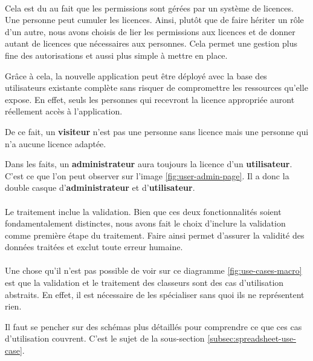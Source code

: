 \paragraph{}
Cela est du au fait que les permissions sont gérées par un système de licences. Une personne peut cumuler les licences. Ainsi, plutôt que de faire hériter un rôle d'un autre, nous avons choisis de lier les permissions aux licences et de donner autant de licences que nécessaires aux personnes. Cela permet une gestion plus fine des autorisations et aussi plus simple à mettre en place.

Grâce à cela, la nouvelle application peut être déployé avec la base des utilisateurs existante complète sans risquer de compromettre les ressources qu'elle expose. En effet, seuls les personnes qui recevront la licence appropriée auront réellement accès à l'application.

De ce fait, un \textbf{visiteur} n'est pas une personne sans licence mais une personne qui n'a aucune licence adaptée.

Dans les faits, un \textbf{administrateur} aura toujours la licence d'un \textbf{utilisateur}. C'est ce que l'on peut observer sur l'image \ref{fig:user-admin-page}. Il a donc la double casque d'\textbf{administrateur} et d'\textbf{utilisateur}.

\paragraph{}
Le traitement inclue la validation. Bien que ces deux fonctionnalités soient fondamentalement distinctes, nous avons fait le choix d'inclure la validation comme première étape du traitement. Faire ainsi permet d'assurer la validité des données traitées et exclut toute erreur humaine.

\paragraph{}
Une chose qu'il n'est pas possible de voir sur ce diagramme \ref{fig:use-cases-macro} est que la validation et le traitement des classeurs sont des cas d'utilisation abstraits. En effet, il est nécessaire de les spécialiser sans quoi ils ne représentent rien.

Il faut se pencher sur des schémas plus détaillés pour comprendre ce que ces cas d'utilisation couvrent. C'est le sujet de la sous-section \ref{subsec:spreadsheet-use-case}.
